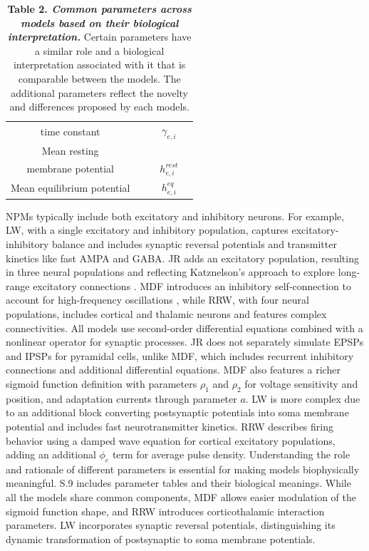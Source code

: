 \documentclass[12pt,twoside]{article}
\begin{document}
\begin{table}
\begin{tabular}{ccccc}
        \rowcolor{gray!70}
        time constant & & &\multirow{-2}{*}{$\gamma_{e,i}$} &\\
        \rowcolor{gray!20}
        Mean resting  & & & & \\
        \rowcolor{gray!20}
        membrane potential & & & \multirow{-2}{*}{$h_{e,i}^{rest}$}& \\
        \rowcolor{gray!70}
        Mean equilibrium potential & & & $h_{e,i}^{eq}$& \\
    \end{tabular}
        \caption*{\textbf{Table 2. \textit{Common parameters across models based on their biological interpretation.}} Certain parameters have a similar role and a biological interpretation associated with it that is comparable between the models. The additional parameters reflect the novelty and differences proposed by each models.
        \vspace{-0.5cm}}  
    \label{tab:global_eval}
\end{table}
NPMs typically include both excitatory and inhibitory neurons. For example, LW, with a single excitatory and inhibitory population, captures excitatory-inhibitory balance and includes synaptic reversal potentials and transmitter kinetics like fast AMPA and GABA. JR adds an excitatory population, resulting in three neural populations and reflecting Katznelson's approach to explore long-range excitatory connections \citep{katznelson1981normal, jansen1993neurophysiologically}. MDF introduces an inhibitory self-connection to account for high-frequency oscillations \citep{moran2007neural}, while RRW, with four neural populations, includes cortical and thalamic neurons and features complex connectivities. All models use second-order differential equations combined with a nonlinear operator for synaptic processes. JR does not separately simulate EPSPs and IPSPs for pyramidal cells, unlike MDF, which includes recurrent inhibitory connections and additional differential equations. MDF also features a richer sigmoid function definition with parameters $\rho_{1}$ and $\rho_{2}$ for voltage sensitivity and position, and adaptation currents through parameter $a$. LW is more complex due to an additional block converting postsynaptic potentials into soma membrane potential and includes fast neurotransmitter kinetics. RRW describes firing behavior using a damped wave equation for cortical excitatory populations, adding an additional $\phi_e$ term for average pulse density. Understanding the role and rationale of different parameters is essential for making models biophysically meaningful. S.9 includes parameter tables and their biological meanings. While all the models share common components, MDF allows easier modulation of the sigmoid function shape, and RRW introduces corticothalamic interaction parameters. 
LW incorporates synaptic reversal potentials, distinguishing its dynamic transformation of postsynaptic to soma membrane potentials.
\end{document}
